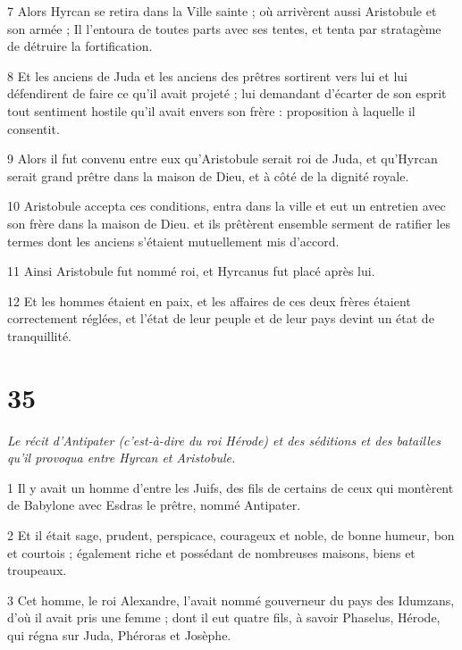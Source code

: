 \par 7 Alors Hyrcan se retira dans la Ville sainte ; où arrivèrent aussi Aristobule et son armée ; Il l'entoura de toutes parts avec ses tentes, et tenta par stratagème de détruire la fortification.

\par 8 Et les anciens de Juda et les anciens des prêtres sortirent vers lui et lui défendirent de faire ce qu'il avait projeté ; lui demandant d'écarter de son esprit tout sentiment hostile qu'il avait envers son frère : proposition à laquelle il consentit.

\par 9 Alors il fut convenu entre eux qu'Aristobule serait roi de Juda, et qu'Hyrcan serait grand prêtre dans la maison de Dieu, et à côté de la dignité royale.

\par 10 Aristobule accepta ces conditions, entra dans la ville et eut un entretien avec son frère dans la maison de Dieu. et ils prêtèrent ensemble serment de ratifier les termes dont les anciens s'étaient mutuellement mis d'accord.

\par 11 Ainsi Aristobule fut nommé roi, et Hyrcanus fut placé après lui.

\par 12 Et les hommes étaient en paix, et les affaires de ces deux frères étaient correctement réglées, et l'état de leur peuple et de leur pays devint un état de tranquillité.

\chapter{35}

\par \textit{Le récit d'Antipater (c'est-à-dire du roi Hérode) et des séditions et des batailles qu'il provoqua entre Hyrcan et Aristobule.}

\par 1 Il y avait un homme d'entre les Juifs, des fils de certains de ceux qui montèrent de Babylone avec Esdras le prêtre, nommé Antipater.

\par 2 Et il était sage, prudent, perspicace, courageux et noble, de bonne humeur, bon et courtois ; également riche et possédant de nombreuses maisons, biens et troupeaux.

\par 3 Cet homme, le roi Alexandre, l'avait nommé gouverneur du pays des Idumzans, d'où il avait pris une femme ; dont il eut quatre fils, à savoir Phaselus, Hérode, qui régna sur Juda, Phéroras et Josèphe.

